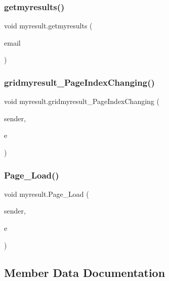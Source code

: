 \subsubsection{\texorpdfstring{getmyresults()}{getmyresults()}}
{\footnotesize\ttfamily void myresult.\+getmyresults (\begin{DoxyParamCaption}\item[{string}]{email }\end{DoxyParamCaption})}

\mbox{\label{classmyresult_a610ba3ac6999b8da6dd5ed8be6a8ba73}} 
\subsubsection{\texorpdfstring{gridmyresult\_PageIndexChanging()}{gridmyresult\_PageIndexChanging()}}
{\footnotesize\ttfamily void myresult.\+gridmyresult\+\_\+\+Page\+Index\+Changing (\begin{DoxyParamCaption}\item[{object}]{sender,  }\item[{Grid\+View\+Page\+Event\+Args}]{e }\end{DoxyParamCaption})\hspace{0.3cm}{\ttfamily [protected]}}

\mbox{\label{classmyresult_ab58a038a34f73e4b5c372814f464dee1}} 
\subsubsection{\texorpdfstring{Page\_Load()}{Page\_Load()}}
{\footnotesize\ttfamily void myresult.\+Page\+\_\+\+Load (\begin{DoxyParamCaption}\item[{object}]{sender,  }\item[{Event\+Args}]{e }\end{DoxyParamCaption})\hspace{0.3cm}{\ttfamily [protected]}}



\subsection{Member Data Documentation}
\mbox{\label{classmyresult_ae669e3bc3fa5f93f7139fd236b4a6f81}} 

